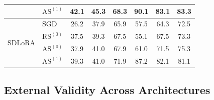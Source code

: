 \documentclass[10pt]{article} %
\begin{document}
{\begin{table}[t]
{\begin{tabular}{@{}l l c c c c c c@{}}
& $\mathrm{AS}^{(1)}$     & 42.1 & 45.3 & 68.3 & 90.1 & 83.1 & 83.3 \\
\midrule
\multirow{4}{*}{SDLoRA}
& SGD                     & 26.2 & 37.9 & 65.9 & 57.5 & 64.3 & 72.5 \\
& $\mathrm{RS}^{(0)}$     & 37.5 & 39.3 & 67.5 & 55.1 & 67.5 & 73.3 \\
& $\mathrm{AS}^{(0)}$     & 37.9 & 41.0 & 67.9 & 61.0 & 71.5 & 75.3 \\
& $\mathrm{AS}^{(1)}$     & 39.3 & 41.0 & 71.9 & 87.2 & 82.1 & 81.1 \\
\bottomrule
\end{tabular}
}
\vspace{-4pt}
\end{table}
}




\subsection{External Validity Across Architectures}
\label{sec:external}
\end{document}
